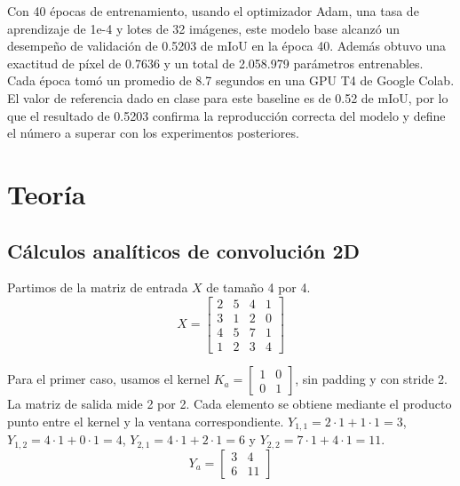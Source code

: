 \documentclass[10pt,letterpaper]{article}
\newcommand{\sangria}{\hspace*{1.5em}}
\begin{document}
Con 40 épocas de entrenamiento, usando el optimizador Adam, una tasa de aprendizaje de 1e-4 y lotes de 32 imágenes, este modelo base alcanzó un desempeño de validación de 0.5203 de mIoU en la época 40. Además obtuvo una exactitud de píxel de 0.7636 y un total de 2.058.979 parámetros entrenables. Cada época tomó un promedio de 8.7 segundos en una GPU T4 de Google Colab. El valor de referencia dado en clase para este baseline es de 0.52 de mIoU, por lo que el resultado de 0.5203 confirma la reproducción correcta del modelo y define el número a superar con los experimentos posteriores.

\section{Teoría}

\subsection{Cálculos analíticos de convolución 2D}

\sangria Partimos de la matriz de entrada $X$ de tamaño 4 por 4.
\[
    X = \begin{bmatrix}
        2 & 5 & 4 & 1 \\
        3 & 1 & 2 & 0 \\
        4 & 5 & 7 & 1 \\
        1 & 2 & 3 & 4
    \end{bmatrix}
\]

Para el primer caso, usamos el kernel $K_a = \begin{bmatrix} 1 & 0 \\ 0 & 1 \end{bmatrix}$, sin padding y con stride 2. La matriz de salida mide 2 por 2. Cada elemento se obtiene mediante el producto punto entre el kernel y la ventana correspondiente.
$Y_{1,1} = 2 \cdot 1 + 1 \cdot 1 = 3$, $Y_{1,2} = 4 \cdot 1 + 0 \cdot 1 = 4$, $Y_{2,1} = 4 \cdot 1 + 2 \cdot 1 = 6$ y $Y_{2,2} = 7 \cdot 1 + 4 \cdot 1 = 11$.
\[
    Y_a = \begin{bmatrix} 3 & 4 \\ 6 & 11 \end{bmatrix}
\]
\end{document}
